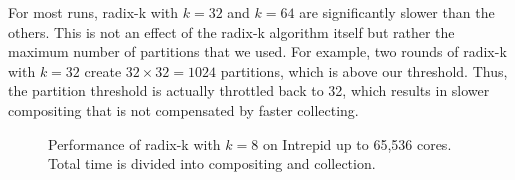 \documentclass{sig-alternate}
\begin{document}
For most runs, radix-k with $k=32$ and $k=64$ are significantly slower than
the others.  This is not an effect of the radix-k algorithm itself but
rather the maximum number of partitions that we used.  For example, two
rounds of radix-k with $k=32$ create $32 \times 32 = 1024$ partitions,
which is above our threshold.  Thus, the partition threshold is actually
throttled back to 32, which results in slower compositing that is not
compensated by faster collecting.

\begin{figure}[htbp]
  \centering
  \hfill
  \caption{Performance of radix-k with $k=8$ on Intrepid up to 65,536
    cores.  Total time is divided into compositing and collection.}
  \label{fig:ScalingCollect}
\end{figure}
\end{document}
